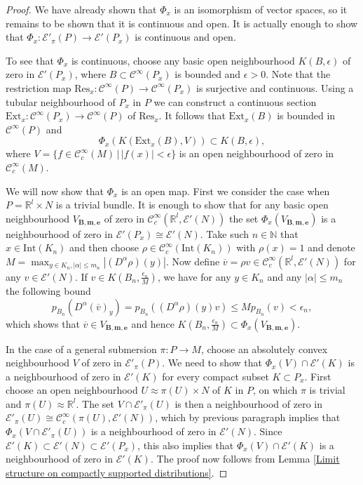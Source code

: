 \documentclass[a4paper]{amsart}
\newcommand{\RR}{\mathbb{R}}
\newcommand{\NN}{\mathbb{N}}
\newcommand{\cE}{\mathcal{E}}
\newcommand{\C}{\mathord{\mathcal{C}^{\infty}}}
\newcommand{\Cc}{\mathord{\mathcal{C}^{\infty}_{c}}}
\begin{document}
\begin{proof}
We have already shown that $\Phi_{x}$ is an isomorphism of vector spaces, so it remains to be
shown that it is continuous and open. It is actually enough to show that $\Phi_{x}:\cE'_{\pi}(P)\to\cE'(P_{x})$ is continuous and open.

To see that $\Phi_{x}$ is continuous, choose any basic open neighbourhood $K(B,\epsilon)$ of zero in $\cE'(P_{x})$,
where $B\subset\C(P_{x})$ is bounded and $\epsilon>0$. Note that the restriction map $\text{Res}_{x}:\C(P)\to\C(P_{x})$ is surjective and
continuous. Using a tubular neighbourhood of $P_{x}$ in $P$ we can construct a continuous section
$\text{Ext}_{x}:\C(P_{x})\to\C(P)$ of $\text{Res}_{x}$. It follows that $\text{Ext}_{x}(B)$ is bounded in $\C(P)$ and
\[
\Phi_{x}(K(\text{Ext}_{x}(B),V))\subset K(B,\epsilon),
\]
where $V=\{f\in\Cc(M)\,|\,|f(x)|<\epsilon\}$ is an open neighbourhood of zero in $\Cc(M)$.

We will now show that $\Phi_{x}$ is an open map. First we consider the case when $P=\RR^{l}\times N$ is a trivial bundle. 
It is enough to show that for any basic open neighbourhood $V_{\textbf{B},\textbf{m},\textbf{e}}$ of zero in $\Cc(\RR^{l},\cE'(N))$
the set $\Phi_{x}(V_{\textbf{B},\textbf{m},\textbf{e}})$ is a neighbourhood of zero in $\cE'(P_{x})\cong\cE'(N)$.
Take such $n\in\NN$ that $x\in\text{Int}(K_{n})$ and then choose $\rho\in\Cc(\text{Int}(K_{n}))$
with $\rho(x)=1$ and denote
$M=\max_{y\in K_{n},|\alpha|\leq m_{n}}|(D^{\alpha}\rho)(y)|$. Now define $\overline{v}=\rho v\in\Cc(\RR^{l},\cE'(N))$ for any $v\in\cE'(N)$. 
If $v\in K(B_{n},\frac{\epsilon_{n}}{M})$, we have for
any $y\in K_{n}$ and any $|\alpha|\leq m_{n}$ the following bound
\[
p_{B_{n}}(D^{\alpha}(\overline{v})_{y})=p_{B_{n}}((D^{\alpha}\rho)(y)v)\leq Mp_{B_{n}}(v)<\epsilon_{n},
\]
which shows that $\overline{v}\in V_{\textbf{B},\textbf{m},\textbf{e}}$ and
hence $K(B_{n},\frac{\epsilon_{n}}{M})\subset\Phi_{x}(V_{\textbf{B},\textbf{m},\textbf{e}})$.

In the case of a general submersion $\pi:P\to M$, choose an absolutely convex neighbourhood $V$ of zero in $\cE'_{\pi}(P)$. We need to show that
$\Phi_{x}(V)\cap\cE'(K)$ is a neighbourhood of zero in $\cE'(K)$ for every compact subset $K\subset P_{x}$. 
First choose an open neighbourhood $U\approx\pi(U)\times N$ of $K$ in $P$, on
which $\pi$ is trivial and $\pi(U)\approx\RR^{l}$. The set $V\cap\cE'_{\pi}(U)$ is then a neighbourhood of zero in $\cE'_{\pi}(U)\cong\Cc(\pi(U),\cE'(N))$,
which by previous paragraph implies that $\Phi_{x}(V\cap\cE'_{\pi}(U))$ is a neighbourhood of zero in $\cE'(N)$. Since
$\cE'(K)\subset\cE'(N)\subset\cE'(P_{x})$, this also implies that $\Phi_{x}(V)\cap\cE'(K)$ is a neighbourhood of zero in $\cE'(K)$. The proof now follows from
Lemma \ref{Limit structure on compactly supported distributions}.
\end{proof}
\end{document}
